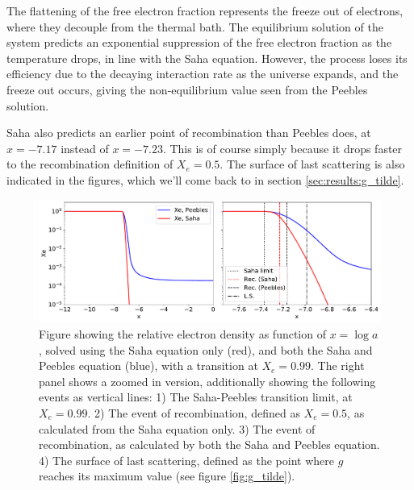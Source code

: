 \documentclass[10pt, a4paper]{article}
\begin{document}
The flattening of the free electron fraction represents the freeze out of electrons, where they decouple from the thermal bath. The equilibrium solution of the system predicts an exponential suppression of the free electron fraction as the temperature drops, in line with the Saha equation. However, the process loses its efficiency due to the decaying interaction rate as the universe expands, and the freeze out occurs, giving the non-equilibrium value seen from the Peebles solution.

Saha also predicts an earlier point of recombination than Peebles does, at $x = -7.17$ instead of $x = - 7.23$. This is of course simply because it drops faster to the recombination definition of $X_e = 0.5$. The surface of last scattering is also indicated in the figures, which we'll come back to in section \ref{sec:results:g_tilde}.



\begin{figure}[H]
    \centering
    \includegraphics[scale=0.5]{../m2_figs/Xe.pdf}
    \caption{Figure showing the relative electron density as function of $x=\log{a}$, solved using the Saha equation only (red), and both the Saha and Peebles equation (blue), with a transition at $X_e = 0.99$. The right panel shows a zoomed in version, additionally showing the following events as vertical lines: 1) The Saha-Peebles transition limit, at $X_e = 0.99$. 2) The event of recombination, defined as $X_e = 0.5$, as calculated from the Saha equation only. 3) The event of recombination, as calculated by both the Saha and Peebles equation. 4) The surface of last scattering, defined as the point where $g$ reaches its maximum value (see figure \ref{fig:g_tilde}).}
    \label{fig:Xe}
\end{figure}
\end{document}
